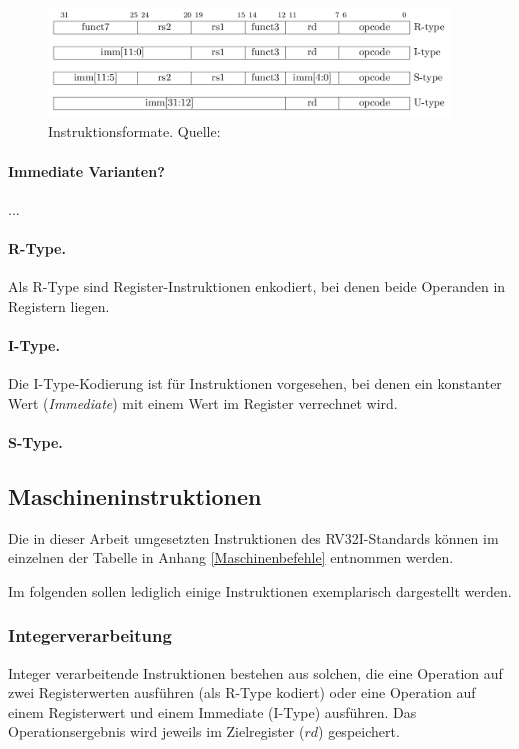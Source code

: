 \begin{figure} [ht]
  \centering
  \includegraphics[width=0.95\textwidth]{Figures/instruction_formats}
  \caption{Instruktionsformate. Quelle: \citep[S. 11]{RISC}}
  \label{fig:instr_types}
\end{figure}

\paragraph{Immediate Varianten?}
...

\paragraph{R-Type.} Als R-Type sind Register-Instruktionen enkodiert, bei denen beide Operanden in Registern liegen.

\paragraph{I-Type.} Die I-Type-Kodierung ist für Instruktionen vorgesehen, bei denen ein konstanter Wert (\textit{Immediate}) mit einem Wert im Register verrechnet wird.

\paragraph{S-Type.}

\subsection{Maschineninstruktionen}
Die in dieser Arbeit umgesetzten Instruktionen des RV32I-Standards können im einzelnen der Tabelle in Anhang \ref{Maschinenbefehle} entnommen werden.

Im folgenden sollen lediglich einige Instruktionen exemplarisch dargestellt werden.

\subsubsection{Integerverarbeitung}
Integer verarbeitende Instruktionen bestehen aus solchen, die eine Operation auf zwei Registerwerten ausführen (als R-Type kodiert) oder eine Operation auf einem Registerwert und einem Immediate (I-Type) ausführen. Das Operationsergebnis wird jeweils im Zielregister ($rd$) gespeichert.

